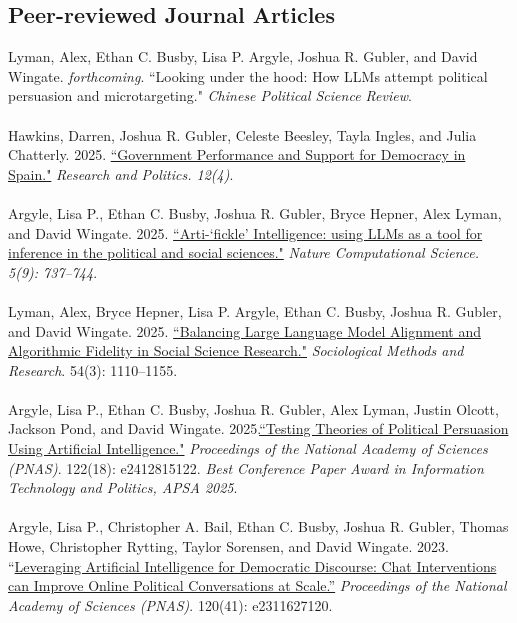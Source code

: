 \documentclass[10pt]{article}
\begin{document}
\begin{flushleft}
\subsection*{Peer-reviewed Journal Articles}
\end{flushleft}
\noindent
Lyman, Alex, Ethan C. Busby, Lisa P. Argyle, Joshua R. Gubler, and David Wingate. \textit{forthcoming}. ``Looking under the hood: How LLMs attempt political persuasion and microtargeting." \textit{Chinese Political Science Review}.\\
\ \\
Hawkins, Darren, Joshua R. Gubler, Celeste Beesley, Tayla Ingles, and Julia Chatterly. 2025. \href{https://journals.sagepub.com/doi/10.1177/20531680251409938}{``Government Performance and Support for Democracy in Spain."} \textit{Research and Politics. 12(4)}.\\
\ \\
Argyle, Lisa P., Ethan C. Busby, Joshua R. Gubler, Bryce Hepner, Alex Lyman, and David Wingate. 2025. \href{https://rdcu.be/ezRK6}{``Arti-`fickle' Intelligence: using LLMs as a tool for inference in the political and social sciences."} \textit{Nature Computational Science. 5(9): 737--744}.\\
\ \\
Lyman, Alex, Bryce Hepner, Lisa P. Argyle, Ethan C. Busby, Joshua R. Gubler, and David Wingate. 2025. \href{https://journals.sagepub.com/eprint/VAN3ZEF7UIIPWXIJNABG/full}{``Balancing Large Language Model Alignment and Algorithmic Fidelity in Social Science Research."} \textit{Sociological Methods and Research}. 54(3): 1110--1155.\\
\ \\
Argyle, Lisa P., Ethan C. Busby, Joshua R. Gubler, Alex Lyman, Justin Olcott, Jackson Pond, and David Wingate. 2025.\href{https://www.pnas.org/doi/10.1073/pnas.2412815122}{``Testing Theories of Political Persuasion Using Artificial Intelligence."} \textit{Proceedings of the National Academy of Sciences (PNAS)}. 122(18): e2412815122. \textit{Best Conference Paper Award in Information Technology and Politics, APSA 2025}.\\
\ \\
Argyle, Lisa P., Christopher A. Bail, Ethan C. Busby, Joshua R. Gubler, Thomas Howe, Christopher Rytting, Taylor Sorensen, and David Wingate. 2023. ``\href{https://www.pnas.org/doi/10.1073/pnas.2311627120}{Leveraging Artificial Intelligence for Democratic Discourse: Chat Interventions can Improve Online Political Conversations at Scale.''} \textit{Proceedings of the National Academy of Sciences (PNAS)}. 120(41): e2311627120.\\
\end{document}
